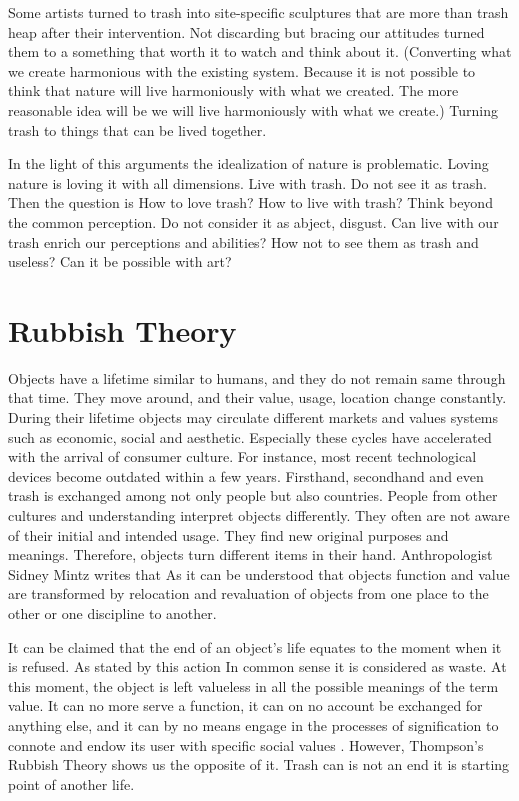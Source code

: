 Some artists turned to trash into site-specific sculptures that are more than trash heap after their intervention. Not discarding but bracing our attitudes turned them to a something that worth it to watch and think about it. (Converting what we create harmonious with the existing system. Because it is not possible to think that nature will live harmoniously with what we created. The more reasonable idea will be we will live harmoniously with what we create.) Turning trash to things that can be lived together.

In the light of this arguments the idealization of nature is problematic. Loving nature is loving it with all dimensions. Live with trash. Do not see it as trash. Then the question is How to love trash? How to live with trash? Think beyond the common perception. Do not consider it as abject, disgust. Can live with our trash enrich our perceptions and abilities? How not to see them as trash and useless? Can it be possible with art?



\section{Rubbish Theory}
Objects have a lifetime similar to humans, and they do not remain same through that time. They move around, and their value, usage, location change constantly. During their lifetime objects may circulate different markets and values systems such as economic, social and aesthetic. Especially these cycles have accelerated with the arrival of consumer culture. For instance, most recent technological devices become outdated within a few years. Firsthand, secondhand and even trash is exchanged among not only people but also countries. People from other cultures and understanding interpret objects differently. They often are not aware of their initial and intended usage. They find new original purposes and meanings. Therefore, objects turn different items in their hand. Anthropologist Sidney Mintz \citep[as cited in][]{strasser1999waste} writes that  As it can be understood that objects function and value are transformed by relocation and revaluation of objects from one place to the other or one discipline to another. 

It can be claimed that the end of an object’s life equates to the moment when it is refused. As stated by \citet[63]{emgin2012trashion} this action  In common sense it is considered as waste. At this moment, the object is left valueless in all the possible meanings of the term value. It can no more serve a function, it can on no account be exchanged for anything else, and it can by no means engage in the processes of signification to connote and endow its user with specific social values \citep[63]{emgin2012trashion}. However, Thompson’s Rubbish Theory shows us the opposite of it. Trash can is not an end it is starting point of another life.

